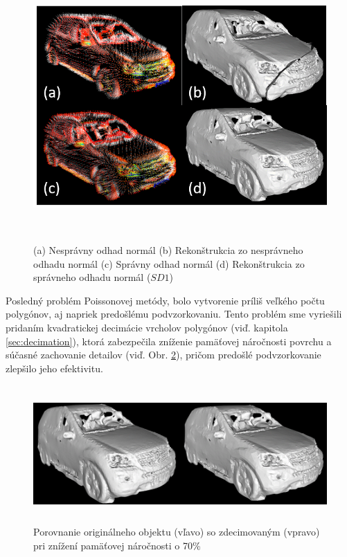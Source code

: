 \begin{figure}[ht]
  \centering
  \includegraphics[width=16cm, height=10.25cm]{img/mesh_bad_normals.png}
  \caption{(a) Nesprávny odhad normál (b) Rekonštrukcia zo nesprávneho odhadu normál (c) Správny odhad normál (d) Rekonštrukcia zo správneho odhadu normál ($SD1$)} 
  \label{fig:mesh_bad_normals}
\end{figure} 

\indent Posledný problém Poissonovej metódy, bolo vytvorenie príliš veľkého počtu polygónov, aj napriek predošlému podvzorkovaniu. Tento problém sme vyriešili pridaním kvadratickej decimácie vrcholov polygónov (viď. kapitola \ref{sec:decimation}), ktorá zabezpečila zníženie pamäťovej náročnosti povrchu a súčasné zachovanie detailov (viď. Obr. \ref{fig:decimation_results}), pričom predošlé podvzorkovanie zlepšilo jeho efektivitu.

\begin{figure}[!htbp]
  \centering
  \includegraphics[width=16cm, height=5.25cm]{img/decimation_results.png}
  \caption{Porovnanie originálneho objektu (vľavo) so zdecimovaným (vpravo) pri znížení pamäťovej náročnosti o 70\%} 
  \label{fig:decimation_results}
\end{figure} 

